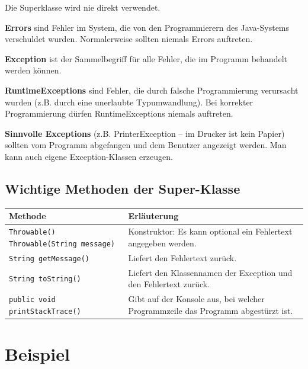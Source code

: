 \begin{compactitem}
\item Die Superklasse \textbf{} wird nie direkt verwendet.
\item \textbf{Errors} sind Fehler im System, die von den Programmierern des
Java-Systems verschuldet wurden. Normalerweise sollten niemals Errors auftreten.
\item \textbf{Exception} ist der Sammelbegriff für alle Fehler, die im Programm
behandelt werden können.
\item \textbf{RuntimeExceptions} sind Fehler, die durch falsche Programmierung
verursacht wurden (z.B. durch eine unerlaubte Typumwandlung). Bei korrekter
Programmierung dürfen RuntimeExceptions niemals auftreten.
\item \textbf{Sinnvolle Exceptions} (z.B. PrinterException – \glqq im Drucker
ist kein Papier\grqq ) sollten vom Programm abgefangen und dem Benutzer
angezeigt werden. Man kann auch eigene Exception-Klassen erzeugen.
\end{compactitem}

\subsection{Wichtige Methoden der Super-Klasse }

\bgroup
\def\arraystretch{1.2}
\begin{tabularx}{\textwidth}{|p{60mm}|X|}
\hline
\textbf{Methode} & \textbf{Erläuterung}
\\ \hline
\lstinline|Throwable()|\newline
\lstinline|Throwable(String message)| & 
Konstruktor: Es kann optional ein Fehlertext angegeben werden.
\\ \hline
\lstinline|String getMessage()| &
Liefert den Fehlertext zurück.
\\ \hline
\lstinline|String toString()| &
Liefert den Klassennamen der Exception und den Fehlertext zurück.
\\ \hline
\lstinline|public void printStackTrace()| &
Gibt auf der Konsole aus, bei welcher Programmzeile das Programm abgestürzt ist.
\\ \hline
\end{tabularx}
\egroup


\section{Beispiel}

